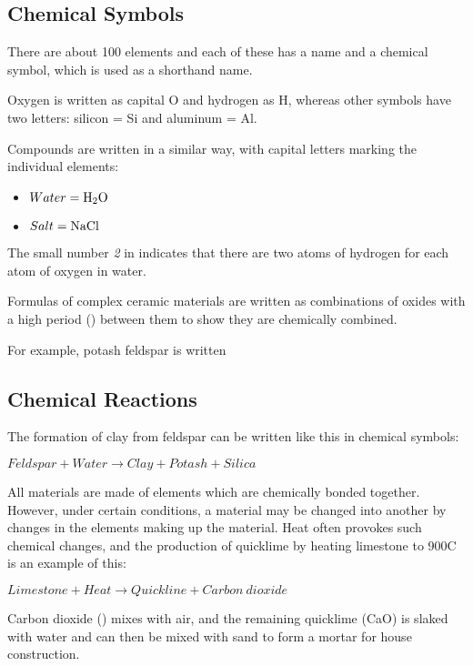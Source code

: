 \subsection{Chemical Symbols}
There are about 100 elements and each of these has a name and a chemical 
symbol, which is used as a shorthand name. 

Oxygen is written as capital O and hydrogen as H, whereas other symbols have 
two letters: silicon = Si and aluminum = Al. 

Compounds are written in a similar way, with capital letters marking the 
individual elements:
\begin{itemize}
\item $Water = \ce{H2O}$
\item $Salt = \ce{NaCl}$
\end{itemize}
The small number \textit{2} in  indicates that there are two atoms of 
hydrogen for each atom of oxygen in water.

Formulas of complex ceramic materials are written as combinations of oxides 
with a high period (\ce{*}) between them to show they are chemically combined. 

For example, potash feldspar is written 
\subsection{Chemical Reactions}
The formation of clay from feldspar can be written like this in chemical 
symbols:


$Feldspar+Water \rightarrow Clay+Potash+Silica$

All materials are made of elements which are chemically bonded together. 
However, under certain conditions, a material may be changed into another by 
changes in the elements making up the material. Heat often provokes such 
chemical changes, and the production of quicklime by heating limestone to 
900\degree C is an example of this: 


$Limestone+Heat \rightarrow Quickline+Carbon~dioxide$

Carbon dioxide () mixes with air, and the remaining quicklime (CaO) is 
slaked with water and can then be mixed with sand to form a mortar for house 
construction. 

